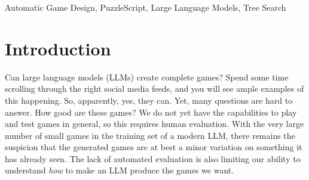 \documentclass[conference]{IEEEtran}
\begin{document}
\maketitle



\begin{abstract}
There is much interest in using large pre-trained models in Automatic Game Design (AGD), whether via the generation of code, assets, or more abstract conceptualization of design ideas. But so far this interest largely stems from the ad hoc use of such generative models under persistent human supervision. Much work remains to show how these tools can be integrated into longer-time-horizon AGD pipelines, in which systems interface with game engines to test generated content autonomously. To this end, we introduce ScriptDoctor, a Large Language Model (LLM)-driven system for automatically generating and testing games in PuzzleScript, an expressive but highly constrained description language for turn-based puzzle games over 2D gridworlds. ScriptDoctor generates and tests game design ideas in an iterative loop, where human-authored examples are used to ground the system's output, compilation errors from the PuzzleScript engine are used to elicit functional code, and search-based agents play-test generated games. ScriptDoctor serves as a concrete example of the potential of automated, open-ended LLM-based workflows in generating novel game content.
\end{abstract}


\begin{IEEEkeywords}
Automatic Game Design, PuzzleScript, Large Language Models, Tree Search
\end{IEEEkeywords}


\section{Introduction}

Can large language models (LLMs) create complete games? Spend some time scrolling through the right social media feeds, and you will see ample examples of this happening. So, apparently, yes, they can. Yet, many questions are hard to answer. How good are these games? We do not yet have the capabilities to play and test games in general, so this requires human evaluation. With the very large number of small games in the training set of a modern LLM, there remains the suspicion that the generated games are at best a minor variation on something it has already seen. The lack of automated evaluation is also limiting our ability to understand \emph{how} to make an LLM produce the games we want.
\end{document}
